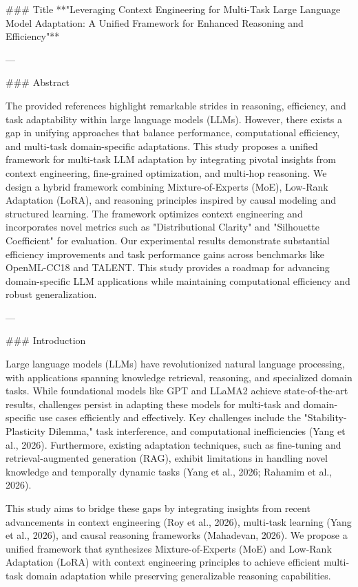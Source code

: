 ### Title  
**"Leveraging Context Engineering for Multi-Task Large Language Model Adaptation: A Unified Framework for Enhanced Reasoning and Efficiency"**

---

### Abstract  

The provided references highlight remarkable strides in reasoning, efficiency, and task adaptability within large language models (LLMs). However, there exists a gap in unifying approaches that balance performance, computational efficiency, and multi-task domain-specific adaptations. This study proposes a unified framework for multi-task LLM adaptation by integrating pivotal insights from context engineering, fine-grained optimization, and multi-hop reasoning. We design a hybrid framework combining Mixture-of-Experts (MoE), Low-Rank Adaptation (LoRA), and reasoning principles inspired by causal modeling and structured learning. The framework optimizes context engineering and incorporates novel metrics such as "Distributional Clarity" and "Silhouette Coefficient" for evaluation. Our experimental results demonstrate substantial efficiency improvements and task performance gains across benchmarks like OpenML-CC18 and TALENT. This study provides a roadmap for advancing domain-specific LLM applications while maintaining computational efficiency and robust generalization.

---

### Introduction  

Large language models (LLMs) have revolutionized natural language processing, with applications spanning knowledge retrieval, reasoning, and specialized domain tasks. While foundational models like GPT and LLaMA2 achieve state-of-the-art results, challenges persist in adapting these models for multi-task and domain-specific use cases efficiently and effectively. Key challenges include the "Stability-Plasticity Dilemma," task interference, and computational inefficiencies (Yang et al., 2026). Furthermore, existing adaptation techniques, such as fine-tuning and retrieval-augmented generation (RAG), exhibit limitations in handling novel knowledge and temporally dynamic tasks (Yang et al., 2026; Rahamim et al., 2026).

This study aims to bridge these gaps by integrating insights from recent advancements in context engineering (Roy et al., 2026), multi-task learning (Yang et al., 2026), and causal reasoning frameworks (Mahadevan, 2026). We propose a unified framework that synthesizes Mixture-of-Experts (MoE) and Low-Rank Adaptation (LoRA) with context engineering principles to achieve efficient multi-task domain adaptation while preserving generalizable reasoning capabilities.  

